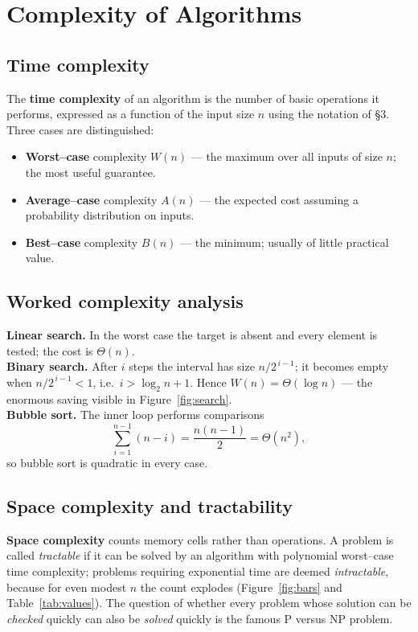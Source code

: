 \documentclass[11pt,a4paper]{article}
\theoremstyle{definition}
\theoremstyle{plain}
\newcommand{\bigTheta}{\Theta}
\begin{document}
\section{Complexity of Algorithms}

\subsection{Time complexity}
The \textbf{time complexity} of an algorithm is the number of basic operations it
performs, expressed as a function of the input size $n$ using the notation of
\S3. Three cases are distinguished:
\begin{itemize}
\item \textbf{Worst--case} complexity $W(n)$ --- the maximum over all inputs of
size $n$; the most useful guarantee.
\item \textbf{Average--case} complexity $A(n)$ --- the expected cost assuming a
probability distribution on inputs.
\item \textbf{Best--case} complexity $B(n)$ --- the minimum; usually of little
practical value.
\end{itemize}

\subsection{Worked complexity analysis}
\noindent\textbf{Linear search.} In the worst case the target is absent and every
element is tested; the cost is $\bigTheta(n)$.\\
\textbf{Binary search.} After $i$ steps the interval has size $n/2^{\,i-1}$; it
becomes empty when $n/2^{\,i-1}<1$, i.e.\ $i>\log_2 n+1$. Hence
$W(n)=\bigTheta(\log n)$ --- the enormous saving visible in Figure~\ref{fig:search}.\\
\textbf{Bubble sort.} The inner loop performs comparisons
\[
\sum_{i=1}^{n-1}(n-i)=\frac{n(n-1)}{2}=\bigTheta(n^2),
\]
so bubble sort is quadratic in every case.

\subsection{Space complexity and tractability}
\textbf{Space complexity} counts memory cells rather than operations. A problem is
called \emph{tractable} if it can be solved by an algorithm with polynomial
worst--case time complexity; problems requiring exponential time are deemed
\emph{intractable}, because for even modest $n$ the count explodes
(Figure~\ref{fig:bars} and Table~\ref{tab:values}). The question of whether every
problem whose solution can be \emph{checked} quickly can also be \emph{solved}
quickly is the famous $\mathrm{P}$ versus $\mathrm{NP}$ problem.
\end{document}
